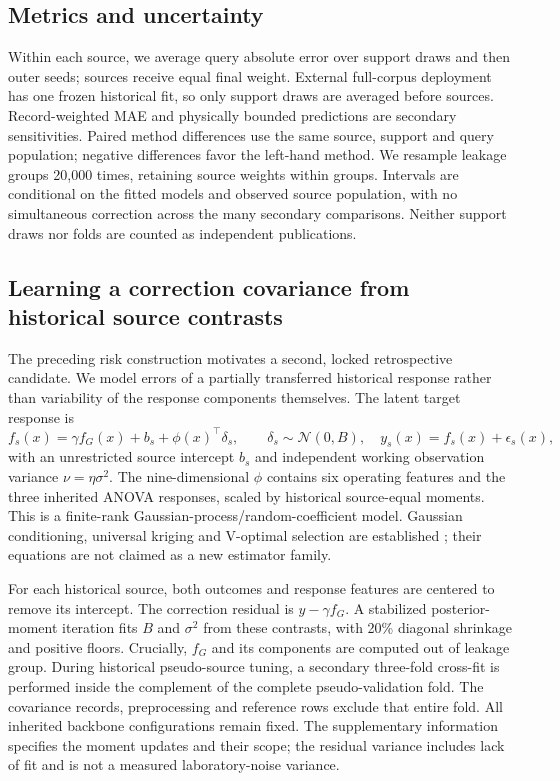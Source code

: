 \documentclass[11pt]{article}
\begin{document}
\subsection{Metrics and uncertainty}
Within each source, we average query absolute error over support draws and then outer seeds; sources receive equal final weight. External full-corpus deployment has one frozen historical fit, so only support draws are averaged before sources. Record-weighted MAE and physically bounded predictions are secondary sensitivities. Paired method differences use the same source, support and query population; negative differences favor the left-hand method. We resample leakage groups 20,000 times, retaining source weights within groups. Intervals are conditional on the fitted models and observed source population, with no simultaneous correction across the many secondary comparisons. Neither support draws nor folds are counted as independent publications.

\subsection{Learning a correction covariance from historical source contrasts}
The preceding risk construction motivates a second, locked retrospective candidate. We model errors of a partially transferred historical response rather than variability of the response components themselves. The latent target response is
\begin{equation}
f_s(x)=\gamma f_G(x)+b_s+\phi(x)^\top\delta_s,\qquad
\delta_s\sim\mathcal N(0,B),\quad y_s(x)=f_s(x)+\epsilon_s(x),
\label{eq:contrastmodel}
\end{equation}
with an unrestricted source intercept $b_s$ and independent working observation variance $\nu=\eta\sigma^2$. The nine-dimensional $\phi$ contains six operating features and the three inherited ANOVA responses, scaled by historical source-equal moments. This is a finite-rank Gaussian-process/random-coefficient model. Gaussian conditioning, universal kriging and V-optimal selection are established \cite{gpml,alpaca,gpmllearn,scaml}; their equations are not claimed as a new estimator family.

For each historical source, both outcomes and response features are centered to remove its intercept. The correction residual is $y-\gamma f_G$. A stabilized posterior-moment iteration fits $B$ and $\sigma^2$ from these contrasts, with 20\% diagonal shrinkage and positive floors. Crucially, $f_G$ and its components are computed out of leakage group. During historical pseudo-source tuning, a secondary three-fold cross-fit is performed inside the complement of the complete pseudo-validation fold. The covariance records, preprocessing and reference rows exclude that entire fold. All inherited backbone configurations remain fixed. The supplementary information specifies the moment updates and their scope; the residual variance includes lack of fit and is not a measured laboratory-noise variance.
\end{document}
